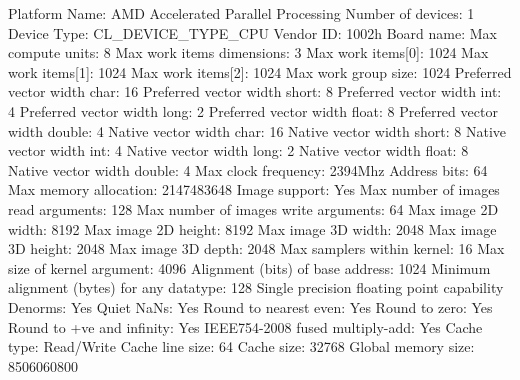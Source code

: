 \begin{codebox}[text]
  Platform Name:                                 AMD Accelerated Parallel Processing
Number of devices:                               1
  Device Type:                                   CL_DEVICE_TYPE_CPU
  Vendor ID:                                     1002h
  Board name:
  Max compute units:                             8
  Max work items dimensions:                     3
    Max work items[0]:                           1024
    Max work items[1]:                           1024
    Max work items[2]:                           1024
  Max work group size:                           1024
  Preferred vector width char:                   16
  Preferred vector width short:                  8
  Preferred vector width int:                    4
  Preferred vector width long:                   2
  Preferred vector width float:                  8
  Preferred vector width double:                 4
  Native vector width char:                      16
  Native vector width short:                     8
  Native vector width int:                       4
  Native vector width long:                      2
  Native vector width float:                     8
  Native vector width double:                    4
  Max clock frequency:                           2394Mhz
  Address bits:                                  64
  Max memory allocation:                         2147483648
  Image support:                                 Yes
  Max number of images read arguments:           128
  Max number of images write arguments:          64
  Max image 2D width:                            8192
  Max image 2D height:                           8192
  Max image 3D width:                            2048
  Max image 3D height:                           2048
  Max image 3D depth:                            2048
  Max samplers within kernel:                    16
  Max size of kernel argument:                   4096
  Alignment (bits) of base address:              1024
  Minimum alignment (bytes) for any datatype:    128
  Single precision floating point capability
    Denorms:                                     Yes
    Quiet NaNs:                                  Yes
    Round to nearest even:                       Yes
    Round to zero:                               Yes
    Round to +ve and infinity:                   Yes
    IEEE754-2008 fused multiply-add:             Yes
  Cache type:                                    Read/Write
  Cache line size:                               64
  Cache size:                                    32768
  Global memory size:                            8506060800

\end{codebox}
